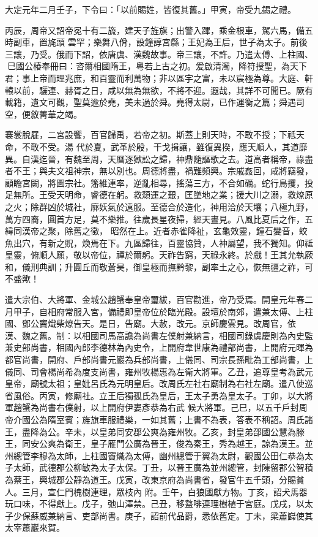 \begin{pinyinscope}
 大定元年二月壬子，下令曰：「以前賜姓，皆復其舊。」甲寅，帝受九錫之禮。



 丙辰，周帝又詔帝冕十有二旒，建天子旌旗；出警入蹕，乘金根車，駕六馬，備五時副車，置旄頭
 雲罕；樂舞八佾，設鐘諄宮縣；王妃為王后，世子為太子。前後三讓，乃受。俄而下詔，依唐虞、漢魏故事。帝三讓，不許。乃遣太傅、上柱國、巳國公椿奉冊曰：咨爾相國隋王，粵若上古之初。爰啟清濁，降符授聖，為天下君；事上帝而理兆庶，和百靈而利萬物；非以區宇之富，未以宸極為尊。大庭、軒轅以前，驪連、赫胥之日，咸以無為無欲，不將不迎。遐哉，其詳不可聞已。厥有載籍，遺文可觀，聖莫逾於堯，美未過於舜。堯得太尉，已作運衡之篇；舜遇司空，便敘菁華之竭。



 褰裳脫屣，二宮設饗，百官歸禹，若帝之初。斯蓋上則天時，不敢不授；下祗天命，不敢不受。湯
 代於夏，武革於殷，干戈揖讓，雖復異揆，應天順人，其道靡異。自漢迄晉，有魏至周，天曆逐獄訟之歸，神鼎隨謳歌之去。道高者稱帝，祿盡者不王；與夫文祖神宗，無以別也。周德將盡，禍難頻興。宗戚姦回，咸將竊發，顧瞻宮闕，將圖宗社。籓維連率，逆亂相尋，搖蕩三方，不合如礪。蛇行鳥攫，投足無所。王受天明命，睿德在躬。救頹運之艱，匡墜地之業；援大川之溺，救燎原之火；除群凶於城社，廓妖氣於遠服。至德合於造化，神用洽於天壤；八極九野，萬方四裔，圓首方足，莫不樂推。往歲長星夜掃，經天晝見。八風比夏后之作，五緯同漢帝之聚，除舊之徵，
 昭然在上。近者赤雀降祉，玄龜效靈，鐘石變音，蛟魚出穴，有新之貺，煥焉在下。九區歸往，百靈協贊，人神屬望，我不獨知。仰祗皇靈，俯順人願，敬以帝位，禪於爾躬。天祚告窮，天祿永終。於戲！王其允執厥和，儀刑典訓；升圓丘而敬蒼昊，御皇極而撫黔黎，副率土之心，恢無疆之祚，可不盛歟！



 遣大宗伯、大將軍、金城公趙蟹奉皇帝璽紱，百官勸進，帝乃受焉。開皇元年春二月甲子，自相府常服入宮，備禮即皇帝位於臨光殿。設壇於南郊，遣兼太傅、上柱國、鄧公竇熾柴燎告天。是日，告廟。大赦，改元。京師慶雲見。改周官，依
 漢、魏之舊。制：以相國司馬高譫為尚書左僕射兼納言，相國司錄虞慶則為內史監兼史部尚書，相國內郎李德林為內史令，上開府韋世康為禮部尚書，上開府元暉為都官尚書，開府、戶部尚書元巖為兵部尚書，上儀同、司宗長孫毗為工部尚書，上儀同、司會楊尚希為度支尚書，雍州牧楊惠為左衛大將軍。乙丑，追尊皇考為武元皇帝，廟號太祖；皇妣呂氏為元明皇后。改周氏左社右廟制為右社左廟。遣八使巡省風俗。丙寅，修廟社。立王后獨孤氏為皇后，王太子勇為皇太子。丁卯，以大將軍趙蟹為尚書右僕射，以上開府伊婁彥恭為右武
 候大將軍。己巳，以五千戶封周帝介國公為隋室賓；旌旗車服禮樂，一如其舊；上書不為表，答表不稱詔。周氏諸王，盡降為公。辛未，以皇弟同安郡公爽為雍州牧。乙亥，封皇弟邵國公慧為滕王，同安公爽為衛王，皇子雁門公廣為晉王，俊為秦王，秀為越王，諒為漢王。並州總管李穆為太師，上柱國竇熾為太傅，幽州總管于翼為太尉，觀國公田仁恭為太子太師，武德郡公柳敏為太子太保。丁丑，以晉王廣為並州總管，封陳留郡公智積為蔡王，興城郡公靜為道王。戊寅，改東京府為尚書省，發官牛五千頭，分賜貧人。三月，宣仁門槐樹連理，眾枝內
 附。壬午，白狼國獻方物。丁亥，詔犬馬器玩口味，不得獻上。戊子，弛山澤禁。己丑，移盩啡連理樹植于宮庭。戊戌，以太子少保蘇威兼納言、吏部尚書。庚子，詔前代品爵，悉依舊定。丁未，梁蕭巋使其太宰蕭巖來賀。




\end{pinyinscope}
